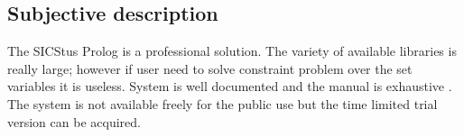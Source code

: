 
\subsection{Subjective description}
The SICStus Prolog is a professional solution. The variety of available libraries 
is really large; however if user need to solve constraint problem over the set variables 
it is useless. System is well documented and the manual is exhaustive \cite{sicstus:manual}. The system
is not available freely for the public use but the time limited trial version can
be acquired.
